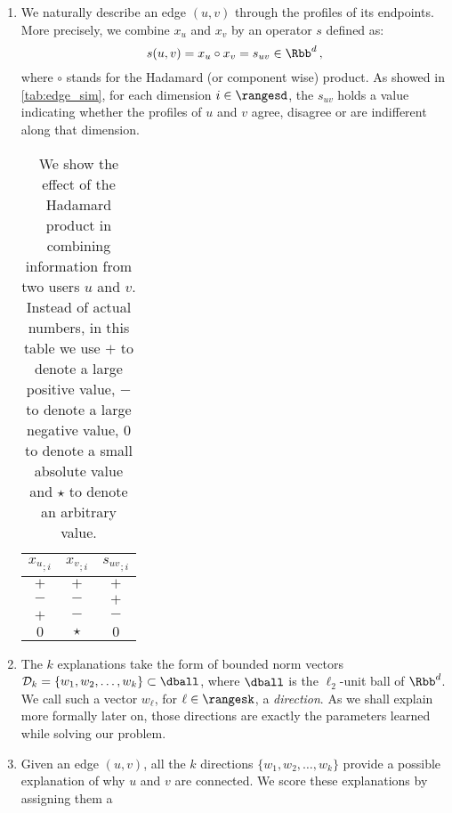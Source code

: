 \begin{enumerate}[1),nosep,leftmargin=*]
  \item We naturally describe an edge $(u,v)$ through the profiles of its endpoints. More precisely,
    we combine $x_u$ and $x_v$ by an operator $s$ defined as:
    \begin{equation*}
      s(u, v) = x_u \circ x_v = s_{uv} \in \Rbb^d \, ,
    \end{equation*}
    where $\circ$ stands for the Hadamard (or component wise) product. As showed in
    \autoref{tab:edge_sim}, for each dimension $i \in \rangesd$, the $s_{uv}$ holds a value
    indicating whether the profiles of $u$ and $v$ agree, disagree or are indifferent along that
    dimension.
    \begin{table}[hb]
      \centering
      \caption{\small We show the effect of the Hadamard product in combining information from two
        users $u$ and $v$. Instead of actual numbers, in this table we use $+$ to denote a large
        positive value, $-$ to denote a large negative value, $0$ to denote a small absolute value
        and $\star$ to denote an arbitrary value.
      \label{tab:edge_sim}}
      \begin{tabular}{ccc}
        \toprule
        ${x_u}_{;i}$ & ${x_v}_{;i}$ & ${s_{uv}}_{;i}$ \\
        \midrule
        $+$          & $+$          & $+$             \\
        $-$          & $-$          & $+$             \\
        $+$          & $-$          & $-$             \\
        $0$          & $\star$      & $0$             \\
        \bottomrule
      \end{tabular}
    \end{table}
  \item The $k$ explanations take the form of bounded norm vectors $\mathcal{D}_k = \{w_1, w_2,
    \ldots, w_k\} \subset \dball$, where $\dball$ is the $\ell_2$-unit ball of $\Rbb^d$. We call such a
    vector $w_\ell$, for $\ell \in \rangesk$, a \emph{direction}. As we shall explain more formally
    later on, those directions are exactly the parameters learned while solving our problem.
  \item Given an edge $(u,v)$, all the $k$ directions $\{w_1, w_2, \ldots, w_k\}$ provide a possible
    explanation of why $u$ and $v$ are connected. We score these explanations by assigning them a

\end{enumerate}
